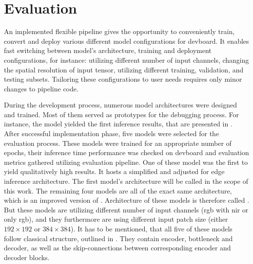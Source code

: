 {

\setlength{\parindent}{0pt}
\setlength{\parskip}{1em}

\chapter{Evaluation}
\label{chapter:evaluation}

An implemented flexible pipeline gives the opportunity to conveniently train, convert and deploy various different model configurations for \gls{devboard}.
It enables fast switching between model's architecture, training and deployment configurations, for instance:
utilizing different number of input channels, changing the spatial resolution of input tensor, utilizing different training, validation, and testing subsets.
Tailoring these configurations to user needs requires only minor changes to pipeline code.

During the development process, numerous model architectures were designed and trained. Most of them served as prototypes for the debugging process.
For instance, the model  yielded the first inference results, that are presented in .
After successful implementation phase, five models were selected for the evaluation process. These models were trained for an appropriate number of epochs,
their inference time performance was checked on \gls{devboard} and evaluation metrics gathered utilizing evaluation pipeline. 
One of these model was the first to yield qualitatively high results.
It hosts a simplified and adjusted for edge inference  architecture\cite{CloudNet2019}.
The first model's architecture will be called  in the scope of this work.
The remaining four models are all of the exact same architecture, which is an improved version of .
Architecture of these models is therefore called .
But these models are utilizing different number of input channels (\gls{rgb} with \gls{nir} or only \gls{rgb}),
and they furthermore are using different input patch size (either \ensuremath{192\times192} or \ensuremath{384\times384}).
It has to be mentioned, that all five of these models follow classical  structure,
outlined in . They contain encoder, bottleneck and decoder,
as well as the skip-connections between corresponding encoder and decoder blocks.


}

